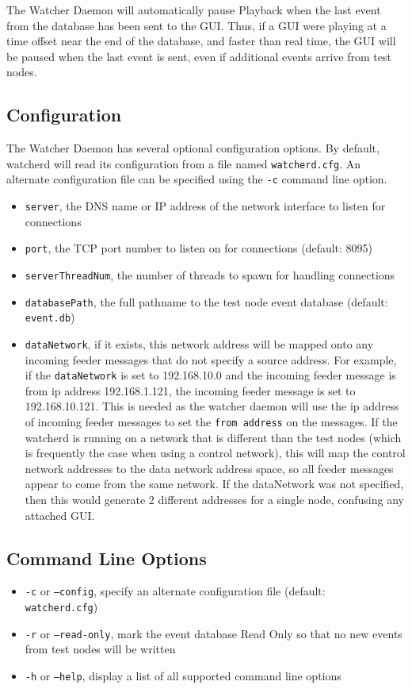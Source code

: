 The Watcher Daemon will automatically pause Playback when the last event from
the database has been sent to the GUI.  Thus, if a GUI were playing at a time
offset near the end of the database, and faster than real time, the GUI will be
paused when the last event is sent, even if additional events arrive from test
nodes.

\subsection{Configuration}

The Watcher Daemon has several optional configuration options.  By default,
watcherd will read its configuration from a file named {\tt watcherd.cfg}.  An
alternate configuration file can be specified using the {\tt -c} command line
option.

\begin{itemize}
\item {\tt server}, the DNS name or IP address of the network interface to listen for
connections
\item {\tt port}, the TCP port number to listen on for connections (default: 8095)
\item {\tt serverThreadNum}, the number of threads to spawn for handling connections
\item {\tt databasePath}, the full pathname to the test node event database (default:
{\tt event.db})
\item {\tt dataNetwork}, if it exists, this network address will be mapped onto any
incoming feeder messages that do not specify a source address. For example, if the 
{\tt dataNetwork} is set to 192.168.10.0 and the incoming feeder message is from ip address
192.168.1.121, the incoming feeder message is set to 192.168.10.121. This is needed as the watcher
daemon will use the ip address of incoming feeder messages to set the {\tt from address} on the messages.
If the watcherd is running on a network that is different than the test nodes (which is 
frequently the case when using a control network), this will map the control network addresses
to the data network address space, so all feeder messages appear to come from the same
network. If the dataNetwork was not specified, then this would generate 2 different
addresses for a single node, confusing any attached GUI.
\end{itemize}

\subsection{Command Line Options}

\begin{itemize}
\item {\tt -c} or {\tt --config}, specify an alternate configuration file (default: {\tt
watcherd.cfg})
\item {\tt -r} or {\tt --read-only}, mark the event database Read Only so that no
new events from test nodes will be written
\item {\tt -h} or {\tt --help}, display a list of all supported command line
options
\end{itemize}

